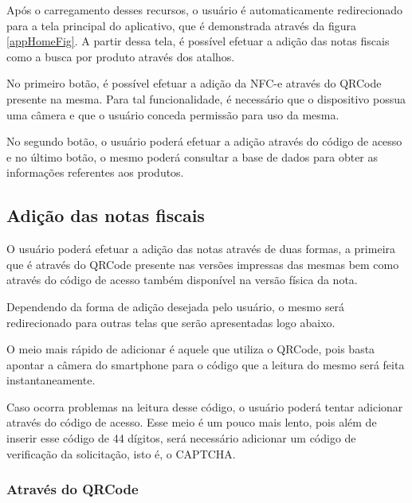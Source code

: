 \newpage
Após o carregamento desses recursos, o usuário é automaticamente redirecionado para a tela principal do aplicativo, que é demonstrada através da figura \ref{appHomeFig}. A partir dessa tela, é possível efetuar a adição das notas fiscais como a busca por produto através dos atalhos.

No primeiro botão, é possível efetuar a adição da NFC-e através do QRCode presente na mesma. Para tal funcionalidade, é necessário que o dispositivo possua uma câmera e que o usuário conceda permissão para uso da mesma.

No segundo botão, o usuário poderá efetuar a adição através do código de acesso e no último botão, o mesmo poderá consultar a base de dados para obter as informações referentes aos produtos.

\subsection{Adição das notas fiscais}

O usuário poderá efetuar a adição das notas através de duas formas, a primeira que é através do QRCode presente nas versões impressas das mesmas bem como através do código de acesso também disponível na versão física da nota.

Dependendo da forma de adição desejada pelo usuário, o mesmo será redirecionado para outras telas que serão apresentadas logo abaixo.

O meio mais rápido de adicionar é aquele que utiliza o QRCode, pois basta apontar a câmera do smartphone para o código que a leitura do mesmo será feita instantaneamente.

Caso ocorra problemas na leitura desse código, o usuário poderá tentar adicionar através do código de acesso. Esse meio é um pouco mais lento, pois além de inserir esse código de 44 dígitos, será necessário adicionar um código de verificação da solicitação, isto é, o CAPTCHA.

\subsubsection{Através do QRCode}

